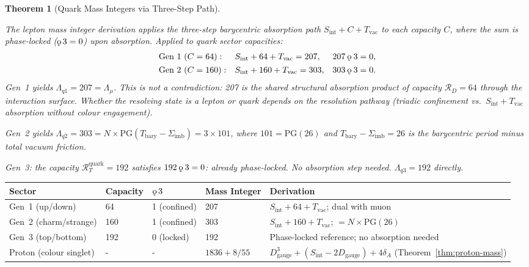 \documentclass[11pt, letterpaper]{article}
\newcommand{\koppa}{\mathbin{\text{\rm\k{o}}}}
\newcommand{\Tbary}{T_{\mathrm{bary}}}
\newcommand{\Dg}{D_{\mathrm{gauge}}}
\newcommand{\Sint}{S_{\mathrm{int}}}
\newcommand{\Sigimb}{\Sigma_{\mathrm{imb}}}
\newcommand{\PG}{\mathrm{PG}}
\theoremstyle{definition}
\theoremstyle{plain}
\newtheorem{theorem}{Theorem}[section]
\begin{document}
\begin{theorem}[Quark Mass Integers via Three-Step Path]\label{thm:quark-mass}
\begin{rsbox}
The lepton mass integer derivation applies the three-step barycentric
absorption path $\Sint+C+T_{\mathrm{vac}}$ to each capacity $C$, where the
sum is phase-locked ($\koppa\,3=0$) upon absorption.  Applied to quark sector
capacities:
\[
\begin{array}{lll}
\text{Gen~1 }(C=64): &
  \Sint+64+T_{\mathrm{vac}}=207, & 207\koppa 3=0,\\[4pt]
\text{Gen~2 }(C=160): &
  \Sint+160+T_{\mathrm{vac}}=303, & 303\koppa 3=0.
\end{array}
\]
Gen~1 yields $\Lambda_{q1}=207=\Lambda_\mu$.  This is not a contradiction:
207 is the shared structural absorption product of capacity $\mathcal{R}_D=64$
through the interaction surface.  Whether the resolving state is a lepton or
quark depends on the resolution pathway (triadic confinement vs.\
$\Sint+T_{\mathrm{vac}}$ absorption without colour engagement).

Gen~2 yields $\Lambda_{q2}=303=N\times\PG(\Tbary-\Sigimb)=3\times 101$,
where $101=\PG(26)$ and $\Tbary-\Sigimb=26$ is the barycentric period minus
total vacuum friction.

Gen~3: the capacity $\mathcal{R}_T^{\mathrm{quark}}=192$ satisfies
$192\koppa 3=0$: already phase-locked.  No absorption step needed.
$\Lambda_{q3}=192$ directly.
\end{rsbox}
\end{theorem}

\begin{center}
\small\renewcommand{\arraystretch}{1.4}
\begin{tabular}{L{3.0cm} L{1.8cm} L{2.2cm} L{2.2cm} L{5.0cm}}
\toprule
\textbf{Sector} & \textbf{Capacity} & \textbf{$\koppa\,3$} &
  \textbf{Mass Integer} & \textbf{Derivation}\\
\midrule
Gen~1 (up/down)        & 64  & 1 (confined) & 207 &
  $\Sint+64+T_{\mathrm{vac}}$; dual with muon\\
Gen~2 (charm/strange)  & 160 & 1 (confined) & 303 &
  $\Sint+160+T_{\mathrm{vac}}$; $=N\times\PG(26)$\\
Gen~3 (top/bottom)     & 192 & 0 (locked)   & 192 &
  Phase-locked reference; no absorption needed\\
Proton (colour singlet)& - & -          & $1836+8/55$ &
  $\Dg^3+(\Sint-2\Dg)+4\delta_A$ (Theorem~\ref{thm:proton-mass})\\
\bottomrule
\end{tabular}
\end{center}
\end{document}
